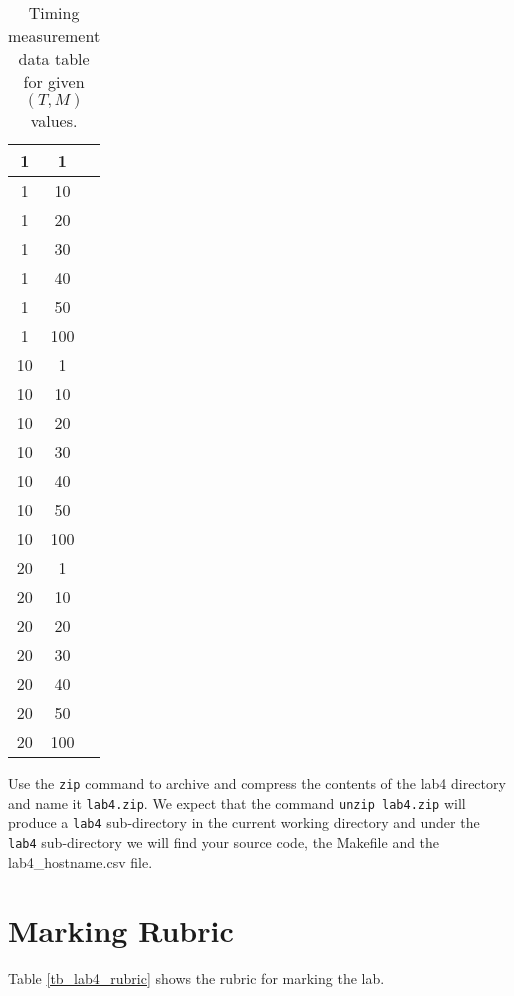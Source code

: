 \begin{enumerate}
\begin{table}[h]
\begin{center}
\begin{tabular}{|c|c|c|}
1 &    1 &    \\ \hline
1 &    10 &    \\ \hline
1 &    20 &    \\ \hline
1 &    30 &    \\ \hline
1 &    40 &    \\ \hline
1 &    50 &    \\ \hline
1 &    100 &    \\ \hline
10 &    1 &    \\ \hline
10 &    10 &    \\ \hline
10 &    20 &    \\ \hline
10 &    30 &    \\ \hline
10 &    40 &    \\ \hline
10 &    50 &    \\ \hline
10 &    100 &    \\ \hline
20 &    1 &    \\ \hline
20 &    10 &    \\ \hline
20 &    20 &    \\ \hline
20 &    30 &    \\ \hline
20 &    40 &    \\ \hline
20 &    50 &    \\ \hline
20 &    100 &    \\ \hline

\end{tabular}
\caption{Timing measurement data table for given $(T, M)$ values.}
\label{tb_timing_lab4}
\end{center}
\end{table}
\end{enumerate}
Use the \verb+zip+ command to archive and compress the contents of the lab4 directory and name it \verb+lab4.zip+. We expect that the command \verb+unzip lab4.zip+ will produce a \verb+lab4+ sub-directory in the current working directory and under the \verb+lab4+ sub-directory we will find your source code, the Makefile and the lab4\_hostname.csv file.

\section{Marking Rubric}

Table \ref{tb_lab4_rubric} shows the rubric for marking the lab.

